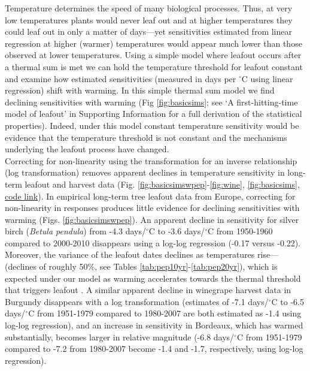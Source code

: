 \documentclass[11pt,letter]{article}
\begin{document}
Temperature determines the speed of many biological processes. Thus, at very low temperatures plants would never leaf out and at higher temperatures they could leaf out in only a matter of days---yet sensitivities estimated from linear regression at higher (warmer) temperatures would appear much lower than those observed at lower temperatures. Using a simple model where leafout occurs after a thermal sum is met we can hold the temperature threshold for leafout constant \citep{zohner2020gcb} and examine how estimated sensitivities (measured in days per $^{\circ}$C using linear regression) shift with warming. In this simple thermal sum model \citep[which we argue is the null model for studies of biological events across different temperatures, Fig. \ref{fig:ospreewsims} and][]{kramer2012book,zohner2020gcb} we find declining sensitivities with warming (Fig \ref{fig:basicsims}; see `A first-hitting-time model of leafout' in Supporting Information for a full derivation of the statistical properties). Indeed, under this model constant temperature sensitivity would be evidence that the temperature threshold is not constant and the mechanisms underlying the leafout process have changed. \\


Correcting for non-linearity using the transformation for an inverse relationship (log transformation) removes apparent declines in temperature sensitivity in long-term leafout and harvest data (Fig. \ref{fig:basicsimswpep}-\ref{fig:wine}, \ref{fig:basicsims}, \href{https://github.com/temporalecologylab/labgit/tree/master/projects/decsenspost}{code link}). In empirical long-term tree leafout data from Europe, correcting for non-linearity in responses produces little evidence for declining sensitivities with warming (Figs. \ref{fig:basicsimswpep}). An apparent decline in sensitivity for silver birch (\emph{Betula pendula}) from -4.3 days/$^{\circ}$C to -3.6 days/$^{\circ}$C from 1950-1960 compared to 2000-2010 disappears using a log-log regression (-0.17 versus -0.22). Moreover, the variance of the leafout dates declines as temperatures rise---(declines of roughly 50\%, see Tables \ref{tab:pep10yr}-\ref{tab:pep20yr}), which is expected under our model as warming accelerates towards the thermal threshold that triggers leafout \citep[and in contrast to predictions from changing mechanisms, see][]{ford2016}. A similar apparent decline in winegrape harvest data in Burgundy disappears with a log transformation (estimates of -7.1 days/$^{\circ}$C to -6.5 days/$^{\circ}$C from 1951-1979 compared to 1980-2007 are both estimated as -1.4 using log-log regression), and an increase in sensitivity in Bordeaux, which has warmed substantially, becomes larger in relative magnitude (-6.8 days/$^{\circ}$C from 1951-1979 compared to -7.2 from 1980-2007 become -1.4 and -1.7, respectively, using log-log regression). \\
\end{document}
